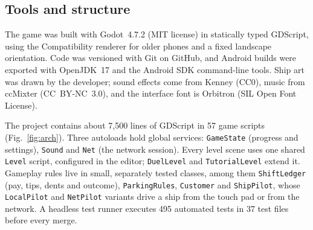 \documentclass[conference]{IEEEtran}
\begin{document}
\subsection{Tools and structure}
The game was built with Godot~4.7.2 (MIT license) in statically typed GDScript, using the Compatibility renderer for older phones and a fixed landscape orientation. Code was versioned with Git on GitHub, and Android builds were exported with OpenJDK~17 and the Android SDK command-line tools. Ship art was drawn by the developer; sound effects come from Kenney (CC0), music from ccMixter (CC~BY-NC~3.0), and the interface font is Orbitron (SIL Open Font License).

The project contains about 7,500 lines of GDScript in 57 game scripts (Fig.~\ref{fig:arch}). Three autoloads hold global services: \texttt{GameState} (progress and settings), \texttt{Sound} and \texttt{Net} (the network session). Every level scene uses one shared \texttt{Level} script, configured in the editor; \texttt{DuelLevel} and \texttt{TutorialLevel} extend it. Gameplay rules live in small, separately tested classes, among them \texttt{ShiftLedger} (pay, tips, dents and outcome), \texttt{ParkingRules}, \texttt{Customer} and \texttt{ShipPilot}, whose \texttt{LocalPilot} and \texttt{NetPilot} variants drive a ship from the touch pad or from the network. A headless test runner executes 495 automated tests in 37 test files before every merge.
\end{document}
